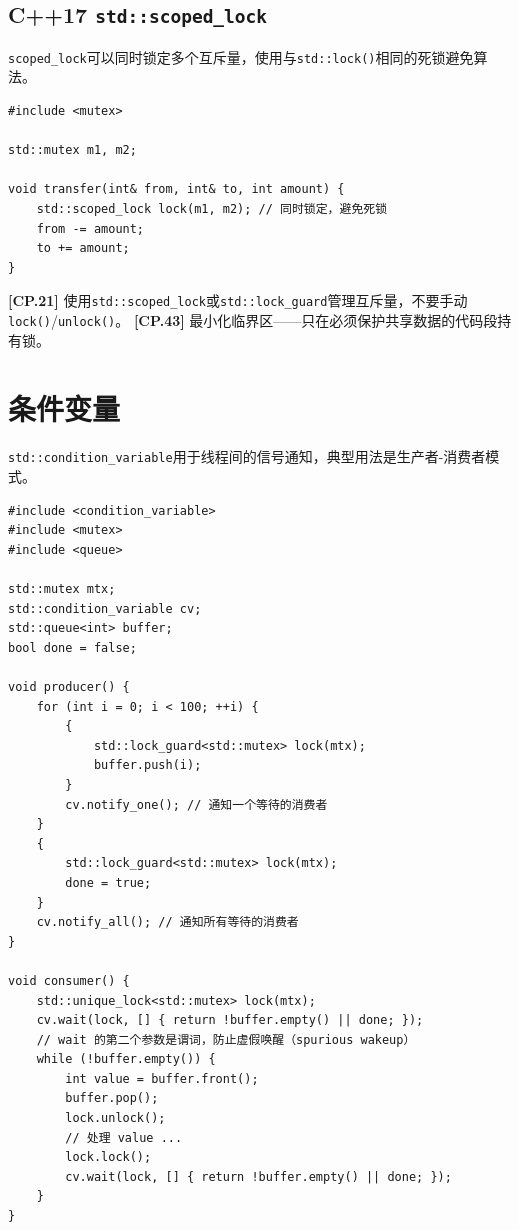 \documentclass[12pt,a4paper,fontset=fandol]{ctexbook}
\newcommand{\cpp}[1]{C++#1}
\newcommand{\guideref}[1]{\textbf{\textcolor{blue!70!black}{[#1]}}}
\begin{document}
\subsection{\cpp{}17 \texttt{std::scoped\_lock}}

\texttt{scoped\_lock}可以同时锁定多个互斥量，使用与\texttt{std::lock()}相同的死锁避免算法。

\begin{lstlisting}
#include <mutex>

std::mutex m1, m2;

void transfer(int& from, int& to, int amount) {
    std::scoped_lock lock(m1, m2); // 同时锁定，避免死锁
    from -= amount;
    to += amount;
}
\end{lstlisting}

\begin{guideline}
\guideref{CP.21} 使用\texttt{std::scoped\_lock}或\texttt{std::lock\_guard}管理互斥量，不要手动\texttt{lock()}/\allowbreak{}\texttt{unlock()}。
\guideref{CP.43} 最小化临界区——只在必须保护共享数据的代码段持有锁。
\end{guideline}

\section{条件变量}

\texttt{std::condition\_variable}用于线程间的信号通知，典型用法是生产者-消费者模式。

\begin{lstlisting}
#include <condition_variable>
#include <mutex>
#include <queue>

std::mutex mtx;
std::condition_variable cv;
std::queue<int> buffer;
bool done = false;

void producer() {
    for (int i = 0; i < 100; ++i) {
        {
            std::lock_guard<std::mutex> lock(mtx);
            buffer.push(i);
        }
        cv.notify_one(); // 通知一个等待的消费者
    }
    {
        std::lock_guard<std::mutex> lock(mtx);
        done = true;
    }
    cv.notify_all(); // 通知所有等待的消费者
}

void consumer() {
    std::unique_lock<std::mutex> lock(mtx);
    cv.wait(lock, [] { return !buffer.empty() || done; });
    // wait 的第二个参数是谓词，防止虚假唤醒（spurious wakeup）
    while (!buffer.empty()) {
        int value = buffer.front();
        buffer.pop();
        lock.unlock();
        // 处理 value ...
        lock.lock();
        cv.wait(lock, [] { return !buffer.empty() || done; });
    }
}
\end{lstlisting}
\end{document}
